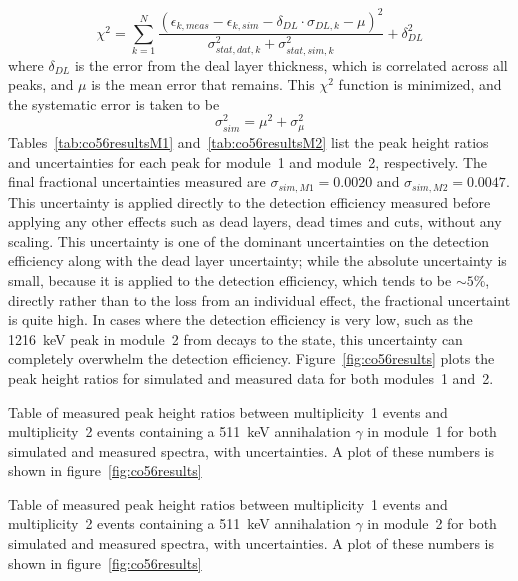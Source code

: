 \documentclass[/main.tex]{subfiles}
\begin{document}
\begin{equation}
  \chi^2 = \displaystyle\sum_{k=1}^N \frac{(\epsilon_{k, meas}-\epsilon_{k, sim}-\delta_{DL}\cdot\sigma_{DL,k} - \mu)^2}{\sigma_{stat,dat,k}^2+\sigma_{stat,sim,k}^2} + \delta_{DL}^2
\end{equation}
where $\delta_{DL}$ is the error from the deal layer thickness, which is correlated across all peaks, and $\mu$ is the mean error that remains.
This $\chi^2$ function is minimized, and the systematic error is taken to be
\begin{equation}
  \sigma_{sim}^2 = \mu^2 + \sigma_\mu^2
\end{equation}
Tables~\ref{tab:co56resultsM1} and~\ref{tab:co56resultsM2} list the peak height ratios and uncertainties for each peak for module~1 and module~2, respectively.
The final fractional uncertainties measured are $\sigma_{sim,M1}=0.0020$ and $\sigma_{sim,M2}=0.0047$.
This uncertainty is applied directly to the detection efficiency measured before applying any other effects such as dead layers, dead times and cuts, without any scaling.
This uncertainty is one of the dominant uncertainties on the detection efficiency along with the dead layer uncertainty; while the absolute uncertainty is small, because it is applied to the detection efficiency, which tends to be $\sim5$\%, directly rather than to the loss from an individual effect, the fractional uncertaint is quite high.
In cases where the detection efficiency is very low, such as the 1216~keV peak in module~2 from decays to the  state, this uncertainty can completely overwhelm the detection efficiency.
Figure~\ref{fig:co56results} plots the peak height ratios for simulated and measured data for both modules~1 and~2.

\begin{table}[p]
  \caption[Table of peak height ratios for module~1]{\label{tab:co56resultsM1}
    Table of measured peak height ratios between multiplicity~1 events and multiplicity~2 events containing a 511~keV annihalation $\gamma$ in module~1 for both simulated and measured  spectra, with uncertainties. A plot of these numbers is shown in figure~\ref{fig:co56results}
  }
  
\end{table}

\begin{table}[p]
  \caption[Table of peak height ratios for module~2]{\label{tab:co56resultsM2}
    Table of measured peak height ratios between multiplicity~1 events and multiplicity~2 events containing a 511~keV annihalation $\gamma$ in module~2 for both simulated and measured  spectra, with uncertainties. A plot of these numbers is shown in figure~\ref{fig:co56results}
  }
  
\end{table}
\end{document}
